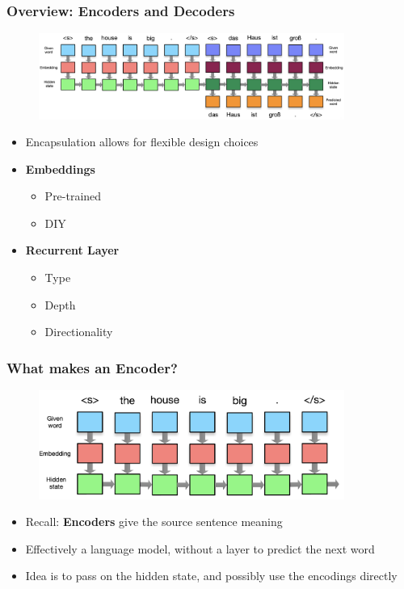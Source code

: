 \documentclass[usenames,dvipsnames]{beamer}
\begin{document}
\begin{frame}
\frametitle{Overview: Encoders and Decoders}
\begin{figure}
  \centering
  \includegraphics[width=10cm, valign=c]{assets/enc-dec}
\end{figure}
\begin{itemize}
  \item Encapsulation allows for flexible design choices
  \item \textbf{Embeddings}
    \begin{itemize}
      \item Pre-trained
      \item DIY
    \end{itemize}
  \item \textbf{Recurrent Layer}
    \begin{itemize}
      \item Type
      \item Depth
      \item Directionality
    \end{itemize}
\end{itemize}
\end{frame}

\begin{frame}
\frametitle{What makes an Encoder?}
\begin{figure}
  \centering
  \includegraphics[width=10cm, valign=c]{assets/encoder}
\end{figure}
\begin{itemize}
  \item Recall: \textbf{Encoders} give the source sentence meaning
  \item Effectively a language model, without a layer to predict the next word
  \item Idea is to pass on the hidden state, and possibly use the encodings directly
\end{itemize}
\end{frame}
\end{document}
